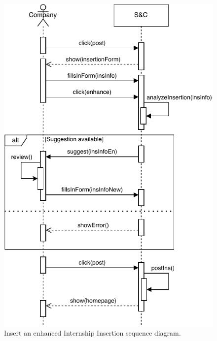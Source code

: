 \begin{figure}[H]
    \begin{center}
        \includegraphics[width=0.8\linewidth]{Images/SequenceDiagram/InsertInternSD.pdf}
        \caption{Insert an enhanced Internship Insertion sequence diagram.}
        \label{fig:insert_intern_seqdiag}%
    \end{center}
\end{figure}

\newpage

